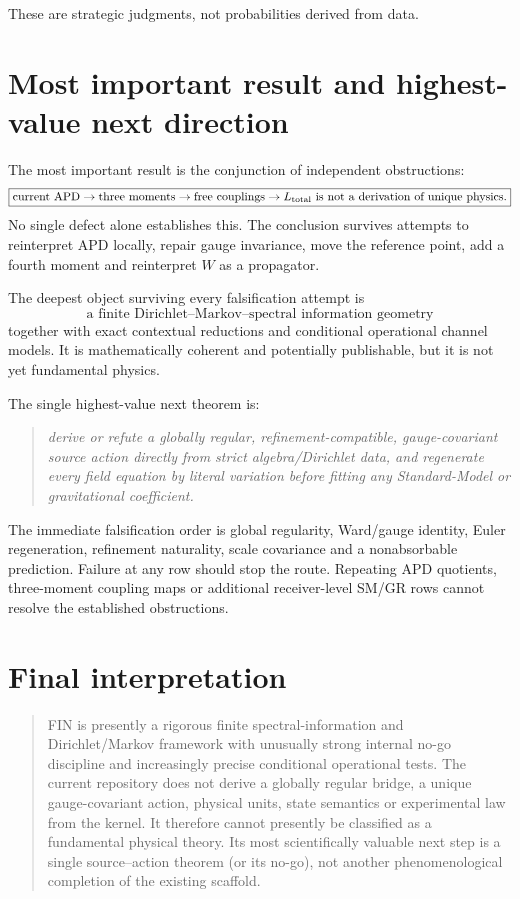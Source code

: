 \documentclass[11pt,a4paper]{article}
\begin{document}
These are strategic judgments, not probabilities derived from data.

\section{Most important result and highest-value next direction}

The most important result is the conjunction of independent obstructions:
\[
\boxed{
\text{current APD}\to\text{three moments}\to\text{free couplings}
\to L_{\rm total}
\text{ is not a derivation of unique physics}.}
\]
No single defect alone establishes this.  The conclusion survives attempts to
reinterpret APD locally, repair gauge invariance, move the reference point,
add a fourth moment and reinterpret $W$ as a propagator.

The deepest object surviving every falsification attempt is
\[
\boxed{
\text{a finite Dirichlet--Markov--spectral information geometry}
}
\]
together with exact contextual reductions and conditional operational channel
models.  It is mathematically coherent and potentially publishable, but it is
not yet fundamental physics.

The single highest-value next theorem is:
\begin{quote}
\emph{derive or refute a globally regular, refinement-compatible,
gauge-covariant source action directly from strict algebra/Dirichlet data, and
regenerate every field equation by literal variation before fitting any
Standard-Model or gravitational coefficient.}
\end{quote}

The immediate falsification order is global regularity, Ward/gauge identity,
Euler regeneration, refinement naturality, scale covariance and a
nonabsorbable prediction.  Failure at any row should stop the route.  Repeating
APD quotients, three-moment coupling maps or additional receiver-level SM/GR
rows cannot resolve the established obstructions.

\section{Final interpretation}

\begin{quote}
FIN is presently a rigorous finite spectral-information and Dirichlet/Markov
framework with unusually strong internal no-go discipline and increasingly
precise conditional operational tests.  The current repository does not
derive a globally regular bridge, a unique gauge-covariant action, physical
units, state semantics or experimental law from the kernel.  It therefore
cannot presently be classified as a fundamental physical theory.  Its most
scientifically valuable next step is a single source--action theorem (or its
no-go), not another phenomenological completion of the existing scaffold.
\end{quote}
\end{document}
